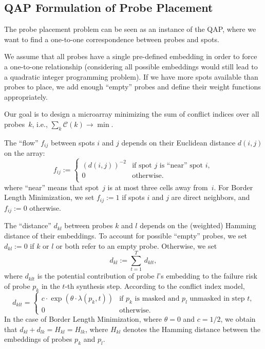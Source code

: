 \documentclass[portrait]{a0poster}
\begin{document}
\begin{multicols}{3}[\aggiheader]
\subsection*{QAP Formulation of Probe Placement}

\noindent The probe placement problem can be seen as an instance of the QAP,
where we want to find a one-to-one correspondence between probes and spots.

\noindent We assume that all probes have a single pre-defined embedding in order
to force a one-to-one relationship (considering all possible embeddings would
still lead to a quadratic integer programming problem). If we have more spots
available than probes to place, we add enough ``empty'' probes and define their
weight functions appropriately.

\noindent Our goal is to design a microarray minimizing the sum of conflict
indices over all probes~$k$, i.e., $\sum_{k} \mathcal{C}(k) \to \min$.

\noindent The ``flow'' $f_{ij}$ between spots $i$ and $j$ depends on their
Euclidean distance $d(i,j)$ on the array:
\begin{equation}
  f_{ij} := \left\{ \begin{array}{ll}
      (d(i,j))^{-2} & \mbox{if spot $j$ is ``near'' spot $i$}, \\
      0 & \mbox{otherwise}. \\
    \end{array} \right.
\end{equation}
where ``near'' means that spot~$j$ is at most three cells away from~$i$. For
Border Length Minimization, we set $f_{ij}:=1$ if spots $i$ and $j$ are direct
neighbors, and $f_{ij}:=0$ otherwise.

\noindent The ``distance'' $d_{kl}$ between probes $k$ and $l$ depends on the
(weighted) Hamming distance of their embeddings. To account for possible
``empty'' probes, we set $d_{kl}:=0$ if $k$ or $l$ or both refer to an empty
probe. Otherwise, we set
\[ d_{kl} := \sum_{t=1}^T\, d_{klt}, \]
where $d_{klt}$ is the potential contribution of probe $l$'s embedding to the
failure risk of probe $p_k$ in the $t$-th synthesis step. According to the
conflict index model,
\[ d_{klt}  = \left\{ \begin{array}{ll}
    c \cdot \exp(\theta \cdot \lambda(p_k,t)) 
    & \mbox{if $p_k$ is masked and $p_l$ unmasked in step $t$,}\\
    0
    & \mbox{otherwise.}
  \end{array} \right.
\]
In the case of Border Length Minimization, where $\theta=0$ and $c=1/2$, we
obtain that $d_{kl} + d_{lk} = H_{kl} = H_{lk}$, where $H_{kl}$ denotes the
Hamming distance between the embeddings of probes $p_k$ and $p_l$.


\end{multicols}
\end{document}
